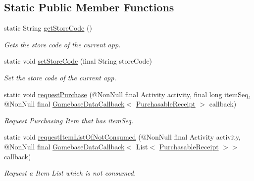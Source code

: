 \subsection*{Static Public Member Functions}
\begin{DoxyCompactItemize}
\item 
static String \hyperlink{classcom_1_1toast_1_1android_1_1gamebase_1_1_gamebase_1_1_purchase_ae6a7d3ccf1e7de6fb479485cce1ddeea}{get\+Store\+Code} ()
\begin{DoxyCompactList}\small\item\em Gets the store code of the current app. \end{DoxyCompactList}\item 
static void \hyperlink{classcom_1_1toast_1_1android_1_1gamebase_1_1_gamebase_1_1_purchase_a8933fcc2fc156c87feee53efadfa4bb0}{set\+Store\+Code} (final String store\+Code)
\begin{DoxyCompactList}\small\item\em Set the store code of the current app. \end{DoxyCompactList}\item 
static void \hyperlink{classcom_1_1toast_1_1android_1_1gamebase_1_1_gamebase_1_1_purchase_a046768008c4f0d0eb8f6c5052f621b87}{request\+Purchase} (@Non\+Null final Activity activity, final long item\+Seq, @Non\+Null final \hyperlink{interfacecom_1_1toast_1_1android_1_1gamebase_1_1_gamebase_data_callback}{Gamebase\+Data\+Callback}$<$ \hyperlink{classcom_1_1toast_1_1android_1_1gamebase_1_1base_1_1purchase_1_1_purchasable_receipt}{Purchasable\+Receipt} $>$ callback)
\begin{DoxyCompactList}\small\item\em Request Purchasing Item that has item\+Seq. \end{DoxyCompactList}\item 
static void \hyperlink{classcom_1_1toast_1_1android_1_1gamebase_1_1_gamebase_1_1_purchase_a335f00febc88c2052a9914278aebdac0}{request\+Item\+List\+Of\+Not\+Consumed} (@Non\+Null final Activity activity, @Non\+Null final \hyperlink{interfacecom_1_1toast_1_1android_1_1gamebase_1_1_gamebase_data_callback}{Gamebase\+Data\+Callback}$<$ List$<$ \hyperlink{classcom_1_1toast_1_1android_1_1gamebase_1_1base_1_1purchase_1_1_purchasable_receipt}{Purchasable\+Receipt} $>$$>$ callback)
\begin{DoxyCompactList}\small\item\em Request a Item List which is not consumed. \end{DoxyCompactList}\item 
$$
\end{DoxyCompactItemize}
